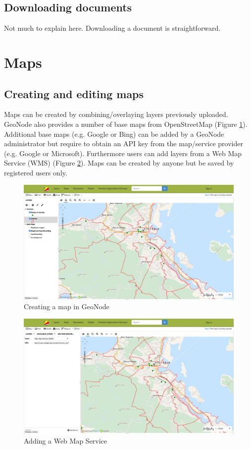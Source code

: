 \documentclass[a4paper,12pt,titlepage]{article}
\begin{document}
\subsection{Downloading documents}

Not much to explain here. Downloading a document is straightforward.

\section{Maps}

\subsection{Creating and editing maps}

Maps can be created by combining/overlaying layers previously uploaded. GeoNode also provides a number of base maps from OpenStreetMap (Figure \ref{fig:map1}). Additional base maps (e.g. Google or Bing) can be added by a GeoNode administrator but require to obtain an API key from the map/service provider (e.g. Google or Microsoft). Furthermore users can add layers from a Web Map Service (WMS) (Figure \ref{fig:map2}). Maps can be created by anyone but be saved by registered users only.

\begin{figure}[H]
	\centering
	\includegraphics[width=12cm]{Images/map1.png}
	\caption{Creating a map in GeoNode}\label{fig:map1}
\end{figure}

\begin{figure}[H]
	\centering
	\includegraphics[width=12cm]{Images/map2.png}
	\caption{Adding a Web Map Service}\label{fig:map2}
\end{figure}
\end{document}
